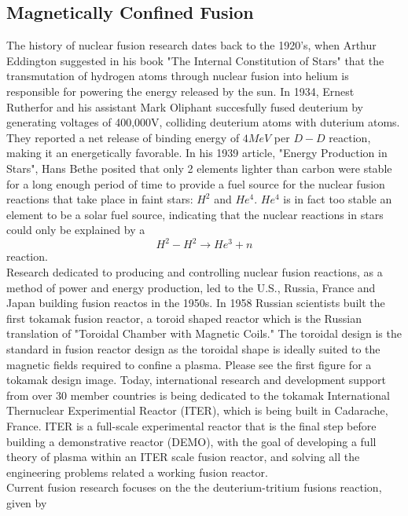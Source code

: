\documentclass{article}
\begin{document}
\subsection{Magnetically Confined Fusion}
The history of nuclear fusion research dates back to the 1920's, when Arthur Eddington suggested in his book "The Internal Constitution of Stars" that the transmutation of hydrogen atoms through nuclear fusion into helium is responsible for powering the energy released by the sun.%
In 1934, Ernest Rutherfor and his assistant Mark Oliphant succesfully fused deuterium by generating voltages of 400,000V, colliding deuterium atoms with duterium atoms.
They reported a net release of binding energy of $4MeV$ per $D-D$ reaction, making it an energetically favorable.%
In his 1939 article, "Energy Production in Stars", Hans Bethe posited that only 2 elements lighter than carbon were stable for a long enough period of time to provide a fuel source for the nuclear fusion reactions that take place in faint stars: $H^2$ and $He^4$. 
$He^4$ is in fact too stable an element to be a solar fuel source, indicating that the nuclear reactions in stars could only be explained by a 
$$
H^2-H^2 \rightarrow He^3 + n
$$ 
reaction.\\%
Research dedicated to producing and controlling nuclear fusion reactions, as a method of power and energy production, led to the U.S., Russia, France and Japan building fusion reactos in the 1950s. In 1958 Russian scientists built the first tokamak fusion reactor, a toroid shaped reactor which is the Russian translation of "Toroidal Chamber with Magnetic Coils." The toroidal design is the standard in fusion reactor design as the toroidal shape is ideally suited to the magnetic fields required to confine a plasma. Please see the first figure for a tokamak design image. Today, international research and development support from over 30 member countries is being dedicated to the tokamak International Thernuclear Experimential Reactor (ITER), which is being built in Cadarache, France. ITER is a full-scale experimental reactor that is the final step before building a demonstrative reactor (DEMO), with the goal of developing a full theory of plasma within an ITER scale fusion reactor, and solving all the engineering problems related a working fusion reactor.\\
Current fusion research focuses on the the deuterium-tritium fusions reaction, given by
\end{document}
